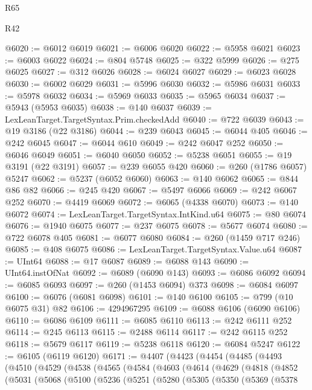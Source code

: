 \begin{lexlean}{R65}
\begin{lexlean}{R42}
\begin{coremodule}
{{{{{{{{{{{{{{{{{{{{{{{{{{{{{{{{{{{{{{{{{{{{{{{{{{{{{{{{{{{{{{{{{{{{{{{{{{{{{{{{{{{{{{{{{{{{{{{{{{{{{{{{{{{{{{{{{{{{{{{{{{{{{{{{{{{{{{{{{{{{{{{{{{{{{{{{{{{{{{{{{{{{{{{{{{{{{{{{{{{{{{{{@6020 := @6012 @6019
@6021 := @6006 @6020
@6022 := @5958 @6021
@6023 := @6003 @6022
@6024 := @804 @5748
@6025 := @322 @5999
@6026 := @275 @6025
@6027 := @312 @6026
@6028 := @6024 @6027
@6029 := @6023 @6028
@6030 := @6002 @6029
@6031 := @5996 @6030
@6032 := @5986 @6031
@6033 := @5978 @6032
@6034 := @5969 @6033
@6035 := @5965 @6034
@6037 := @5943 (@5953 @6035)
@6038 := @140 @6037
@6039 := LexLeanTarget.TargetSyntax.Prim.checkedAdd
@6040 := @722 @6039
@6043 := @19 @3186 (@22 @3186)
@6044 := @239 @6043
@6045 := @6044 @405
@6046 := @242 @6045
@6047 := @6044 @610
@6049 := @242 @6047 @252
@6050 := @6046 @6049
@6051 := @6040 @6050
@6052 := @5238 @6051
@6055 := @19 @3191 (@22 @3191)
@6057 := @239 @6055 @420
@6060 := @260 (@1786 @6057) @5247
@6062 := @5237 (@6052 @6060)
@6063 := @140 @6062
@6065 := @844 @86 @82
@6066 := @245 @420
@6067 := @5497 @6066
@6069 := @242 @6067 @252
@6070 := @4419 @6069
@6072 := @6065 (@4338 @6070)
@6073 := @140 @6072
@6074 := LexLeanTarget.TargetSyntax.IntKind.u64
@6075 := @80 @6074
@6076 := @1940 @6075
@6077 := @237 @6075
@6078 := @5677 @6074
@6080 := @722 @6078 @405
@6081 := @6077 @6080
@6084 := @260 (@1459 @717 @246)
@6085 := @408 @6075
@6086 := LexLeanTarget.TargetSyntax.Value.u64
@6087 := UInt64
@6088 := @17 @6087
@6089 := @6088 @143
@6090 := UInt64.instOfNat
@6092 := @6089 (@6090 @143)
@6093 := @6086 @6092
@6094 := @6085 @6093
@6097 := @260 (@1453 @6094) @373
@6098 := @6084 @6097
@6100 := @6076 (@6081 @6098)
@6101 := @140 @6100
@6105 := @799 (@10 @6075 @31) @82
@6106 := 4294967295
@6109 := @6088 @6106 (@6090 @6106)
@6110 := @6086 @6109
@6111 := @6085 @6110
@6113 := @242 @6111 @252
@6114 := @245 @6113
@6115 := @2488 @6114
@6117 := @242 @6115 @252
@6118 := @5679 @6117
@6119 := @5238 @6118
@6120 := @6084 @5247
@6122 := @6105 (@6119 @6120)
@6171 := @4407
    (@4423
      (@4454
        (@4485
          (@4493
            (@4510
              (@4529
                (@4538
                  (@4565
                    (@4584
                      (@4603
                        (@4614
                          (@4629
                            (@4818
                              (@4852
                                (@5031
                                  (@5068
                                    (@5100
                                      (@5236
                                        (@5251
                                          (@5280
                                            (@5305
                                              (@5350
                                                (@5369
                                                  (@5378
}}}}}}}}}}}}}}}}}}}}}}}}}}}}}}}}}}}}}}}}}}}}}}}}}}}}}}}}}}}}}}}}}}}}}}}}}}}}}}}}}}}}}}}}}}}}}}}}}}}}}}}}}}}}}}}}}}}}}}}}}}}}}}}}}}}}}}}}}}}}}}}}}}}}}}}}}}}}}}}}}}}}}}}}}}}}}}}}}}}}}}}}
\end{coremodule}
\end{lexlean}
\end{lexlean}
